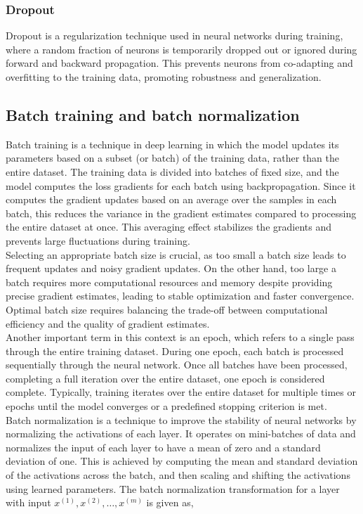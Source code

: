 \subsubsection{Dropout}
Dropout is a regularization technique used in neural networks during training, where a random fraction of neurons is temporarily dropped out or ignored during forward and backward propagation. This prevents neurons from co-adapting and overfitting to the training data, promoting robustness and generalization. 
\subsection{Batch training and batch normalization}
Batch training is a technique in deep learning in which the model updates its parameters based on a subset (or batch) of the training data, rather than the entire dataset. The training data is divided into batches of fixed size, and the model computes the loss gradients for each batch using backpropagation. Since it computes the gradient updates based on an average over the samples in each batch, this reduces the variance in the gradient estimates compared to processing the entire dataset at once. This averaging effect stabilizes the gradients and prevents large fluctuations during training. \\
Selecting an appropriate batch size is crucial, as too small a batch size leads to frequent updates and noisy gradient updates. On the other hand, too large a batch requires more computational resources and memory despite providing precise gradient estimates, leading to stable optimization and faster convergence. Optimal batch size requires balancing the trade-off between computational efficiency and the quality of gradient estimates. \\                     
Another important term in this context is an epoch, which refers to a single pass through the entire training dataset. During one epoch, each batch is processed sequentially through the neural network. Once all batches have been processed, completing a full iteration over the entire dataset, one epoch is considered complete. Typically, training iterates over the entire dataset for multiple times or epochs until the model converges or a predefined stopping criterion is met. \\
Batch normalization \cite{batchnorm} is a technique to improve the stability of neural networks by normalizing the activations of each layer. It operates on mini-batches of data and normalizes the input of each layer to have a mean of zero and a standard deviation of one. This is achieved by computing the mean and standard deviation of the activations across the batch, and then scaling and shifting the activations using learned parameters. The batch normalization transformation for a layer with input $x^{(1)}, x^{(2)}, \ldots, x^{(m)}$ is given as,
